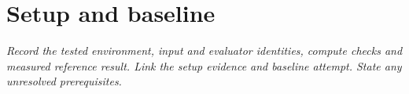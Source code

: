 \section{Setup and baseline}
\label{sec:setup}
\emph{Record the tested environment, input and evaluator identities, compute
checks and measured reference result. Link the setup evidence and baseline
attempt. State any unresolved prerequisites.}
